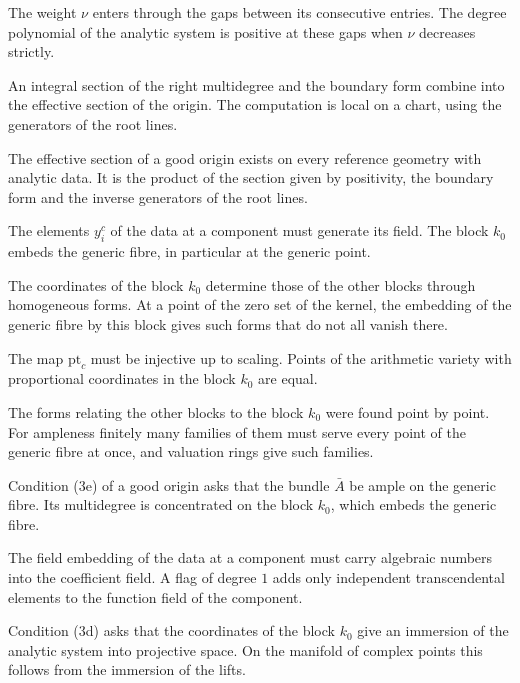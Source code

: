 The weight $\nu$ enters through the gaps between its consecutive entries. The degree polynomial of the analytic
system is positive at these gaps when $\nu$ decreases strictly.

An integral section of the right multidegree and the boundary form combine into the effective section of the
origin. The computation is local on a chart, using the generators of the root lines.

The effective section of a good origin exists on every reference geometry with analytic data. It is the product of
the section given by positivity, the boundary form and the inverse generators of the root lines.

The elements $y^c_i$ of the data at a component must generate its field. The block $k_0$ embeds the generic fibre,
in particular at the generic point.

The coordinates of the block $k_0$ determine those of the other blocks through homogeneous forms. At a point of the
zero set of the kernel, the embedding of the generic fibre by this block gives such forms that do not all vanish there.

The map $\mathrm{pt}_c$ must be injective up to scaling. Points of the arithmetic variety with proportional
coordinates in the block $k_0$ are equal.

The forms relating the other blocks to the block $k_0$ were found point by point. For ampleness finitely many families
of them must serve every point of the generic fibre at once, and valuation rings give such families.

Condition (3e) of a good origin asks that the bundle $\bar A$ be ample on the generic fibre. Its multidegree is
concentrated on the block $k_0$, which embeds the generic fibre.

The field embedding of the data at a component must carry algebraic numbers into the coefficient field. A flag of
degree $1$ adds only independent transcendental elements to the function field of the component.

Condition (3d) asks that the coordinates of the block $k_0$ give an immersion of the analytic system into
projective space. On the manifold of complex points this follows from the immersion of the lifts.

